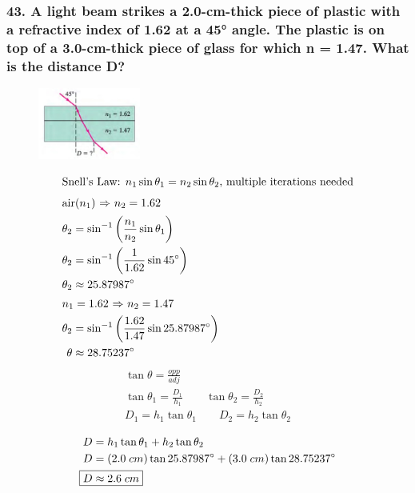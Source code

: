 \documentclass{article}
\newcommand{\bp}[1]{\left(#1\right)}
\begin{document}
\subsubsection*{
    43. A light beam strikes a 2.0-cm-thick piece of plastic with a refractive index
    of 1.62 at a 45° angle. The plastic is on top of a 3.0-cm-thick piece of glass
    for which n = 1.47. What is the distance D?
}
\begin{figure}[h]
    \begin{center}
        \includegraphics[width=0.3\textwidth]{figures/p43.jpg}
    \end{center}
\end{figure}
\begin{align*}
    \intertext{Snell's Law: $n_1\sin\theta_1 = n_2\sin\theta_2$, multiple
    iterations needed}
    \intertext{air($n_1$) $\Rightarrow$ $n_2=1.62$}
    \theta_2 &= \sin^{-1}\bp{\displaystyle\frac{n_1}{n_2}\sin\theta_1} \\
    \theta_2 &= \sin^{-1}\bp{\displaystyle\frac{1}{1.62}\sin 45\degree } \\
    \theta_2 &\approx 25.87987\degree \\
    \intertext{$n_1=1.62$ $\Rightarrow$ $n_2=1.47$}
    \theta_2 &= \sin^{-1}\bp{\displaystyle\frac{1.62}{1.47}\sin 25.87987\degree} \\
    \theta &\approx 28.75237\degree 
\end{align*}
\begin{gather*}
    \tan\theta = \displaystyle\frac{opp}{adj} \\
    \tan\theta_1 = \displaystyle\frac{D_1}{h_1} \qquad \tan\theta_2 = \displaystyle\frac{D_2}{h_2} \\
    D_1 = h_1\tan\theta_1 \qquad D_2 = h_2\tan\theta_2 \\
\end{gather*}
\begin{align*}
    D &= h_1\tan\theta_1 + h_2\tan\theta_2 \\
    D &= (2.0\;cm)\tan 25.87987\degree + (3.0\;cm)\tan 28.75237\degree \\
    \Aboxed{D &\approx 2.6\;cm}
\end{align*}
\newpage
\end{document}
